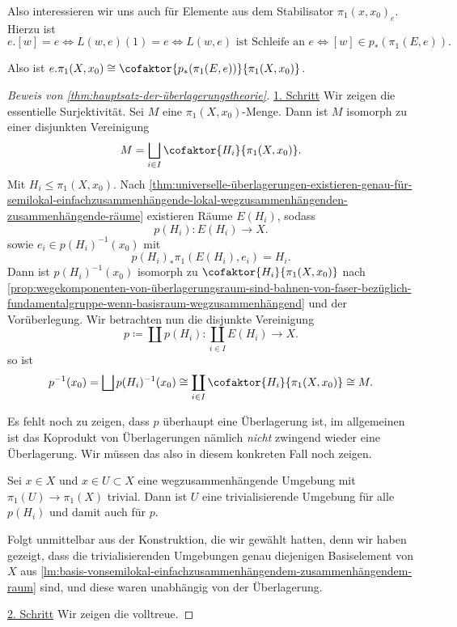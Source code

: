 Also interessieren wir uns auch für Elemente aus dem Stabilisator $\pi_1(x,x_0)_e$. Hierzu ist
\[
    e.[w] = e \iff  L(w,e)(1) = e \iff  L(w,e) \text{ ist Schleife an } e \iff  [w] \in  p_*(\pi_1(E,e))
.\] 

Also ist $e.\pi_1(X,x_0) \cong \cofaktor{p_*(\pi_1(E,e))}{\pi_1(X,x_0)}$.

\begin{proof}[Beweis von \autoref{thm:hauptsatz-der-überlagerungstheorie}]
    \underline{1. Schritt} Wir zeigen die essentielle Surjektivität. Sei $M$ eine  $\pi_1(X,x_0)$-Menge. Dann ist $M$ isomorph zu einer disjunkten Vereinigung
    \[
        M = \bigsqcup_{i\in I} \cofaktor{H_i}{\pi_1(X,x_0)}
    .\] 
    Mit $H_i \leq  \pi_1(X,x_0)$. Nach \autoref{thm:universelle-überlagerungen-existieren-genau-für-semilokal-einfachzusammenhängende-lokal-wegzusammenhängenden-zusammenhängende-räume} existieren Räume $E(H_i)$, sodass
     \[
         p(H_i) \colon  E(H_i) \to  X
    .\] 
    sowie $e_i\in p(H_i)^{-1}(x_0)$ mit 
    \[
        p(H_i)_* \pi_1(E(H_i),e_i) = H_i
    .\] 
    Dann ist $p(H_i)^{-1}(x_0)$ isomorph zu $\cofaktor{H_i}{\pi_1(X,x_0)}$ nach \autoref{prop:wegekomponenten-von-überlagerungsraum-sind-bahnen-von-faser-bezüglich-fundamentalgruppe-wenn-basisraum-wegzusammenhängend} und der Vorüberlegung. Wir betrachten nun die disjunkte Vereinigung
    \[
        p\coloneqq  \coprod p(H_i) \colon  \coprod _{i \in I} E(H_i) \to  X
    .\] 
    so ist
    \[
        p^{-1} (x_0) = \bigsqcup p(H_i)^{-1}(x_0) \cong \coprod_{i \in I} \cofaktor{H_i}{\pi_1(X,x_0)} \cong M
    .\] 
    \begin{remark}
        Es fehlt noch zu zeigen, dass $p$ überhaupt eine Überlagerung ist, im allgemeinen ist das Koprodukt von Überlagerungen nämlich \textit{nicht} zwingend wieder eine Überlagerung. Wir müssen das also in diesem konkreten Fall noch zeigen.
    \end{remark}
    \begin{claim}
        Sei $x\in X$ und $x\in U\subset X$ eine wegzusammenhängende Umgebung mit $\pi_1(U) \to  \pi_1(X)$ trivial. Dann ist $U$ eine trivialisierende Umgebung für alle  $p(H_i)$ und damit auch für  $p$.
    \end{claim}
    \begin{subproof}
        Folgt unmittelbar aus der Konstruktion, die wir gewählt hatten, denn wir haben gezeigt, dass die trivialisierenden Umgebungen genau diejenigen Basiselement von $X$ aus  \autoref{lm:basis-vonsemilokal-einfachzusammenhängendem-zusammenhängendem-raum} sind, und diese waren unabhängig von der Überlagerung.
    \end{subproof}
    \underline{2. Schritt} Wir zeigen die volltreue.


\end{proof}
